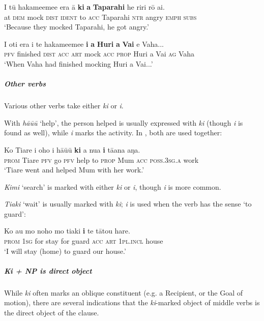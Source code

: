 \ea\label{ex:8.123}
\gll {\ꞌ}I tū hakame{\ꞌ}eme{\ꞌ}e era {\ꞌ}ā \textbf{ki} \textbf{a} \textbf{Taparahi} he riri rō {\ꞌ}ai. \\
at \textsc{dem} mock \textsc{dist} \textsc{ident} to \textsc{acc} Taparahi \textsc{ntr} angry \textsc{emph} \textsc{subs} \\

\glt 
‘Because they mocked Taparahi, he got angry.’ \textstyleExampleref{[R250.012]} 
\z

\ea\label{ex:8.124}
\gll I oti era i te hakame{\ꞌ}eme{\ꞌ}e \textbf{i} \textbf{a} \textbf{Huri} \textbf{{\ꞌ}a} \textbf{Vai} e Vaha... \\
\textsc{pfv} finished \textsc{dist} \textsc{acc} \textsc{art} mock \textsc{acc} \textsc{prop} Huri a Vai \textsc{ag} Vaha \\

\glt 
‘When Vaha had finished mocking Huri a Vai...’ \textstyleExampleref{[R304.094]} 
\z

\subparagraph{Other verbs} Various other verbs take either \textit{ki} or \textit{i}. 

With \textit{hā{\ꞌ}ū{\ꞌ}ū} ‘help’, the person helped is usually expressed with \textit{ki} (though \textit{i} is found as well), while \textit{i} marks the activity. In , both are used together:

\ea\label{ex:8.125}
\gll Ko Tiare i oho i hā{\ꞌ}ū{\ꞌ}ū \textbf{ki} a nua \textbf{i} tā{\ꞌ}ana aŋa. \\
\textsc{prom} Tiare \textsc{pfv} go \textsc{pfv} help to \textsc{prop} Mum \textsc{acc} \textsc{poss.3sg.a} work \\

\glt
‘Tiare went and helped Mum with her work.’ \textstyleExampleref{[R334.125]} 
\z

\textit{Kimi} ‘search’ is marked with either \textit{ki} or \textit{i}, though \textit{i} is more common.

\textit{Tiaki} ‘wait’ is usually marked with \textit{ki}; \textit{i} is used when the verb has the sense ‘to guard’:

\ea\label{ex:8.126}
\gll Ko au mo noho mo tiaki \textbf{i} te tātou hare. \\
\textsc{prom} \textsc{1sg} for stay for guard \textsc{acc} \textsc{art} \textsc{1pl.incl} house \\

\glt 
‘I will stay (home) to guard our house.’ \textstyleExampleref{[R399.130]} 
\z

\subparagraph{\textit{Ki} + NP is direct object} While \textit{ki} often marks an oblique constituent (e.g. a Recipient, or the Goal of motion), there are several indications that the \textit{ki}{}-marked object of middle verbs is the direct object of the clause. 

